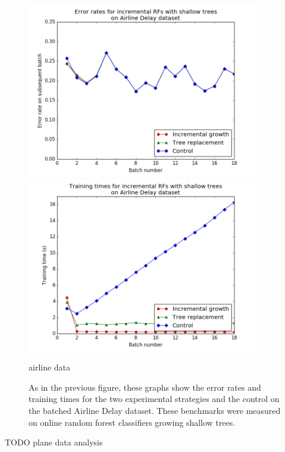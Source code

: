 \begin{figure}
  \centering
  \includegraphics[width=4in]{planeshallow_line}
  \includegraphics[width=4in]{planeshallow_line_time}
  \caption{airline data}
  \caption{As in the previous figure, these graphs show the error rates and
    training times for the two experimental strategies and the control on the
    batched Airline Delay dataset. These benchmarks were measured on online random forest
  classifiers growing shallow trees.}
  \label{fig:plane2}
\end{figure}


TODO plane data analysis


